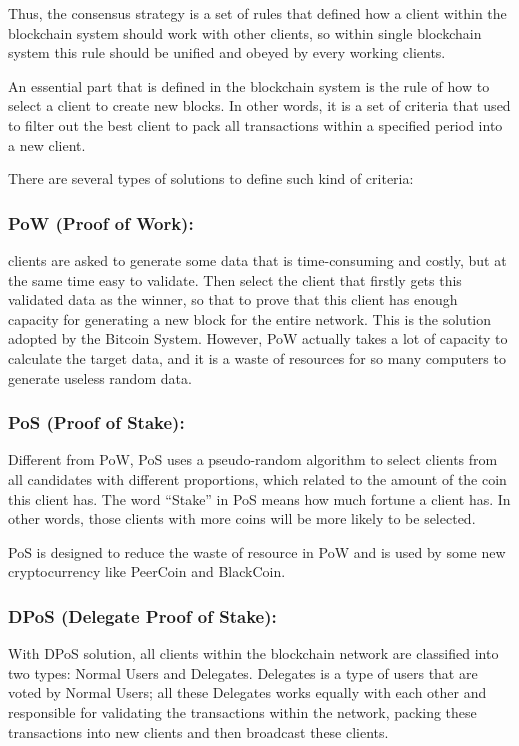 \documentclass[runningheads]{llncs}
\begin{document}
Thus, the consensus strategy is a set of rules that defined how a client within the blockchain system should work with other clients, so within single blockchain system this rule should be unified and obeyed by every working clients.

An essential part that is defined in the blockchain system is the rule of how to select a client to create new blocks. In other words, it is a set of criteria that used to filter out the best client to pack all transactions within a specified period into a new client.

There are several types of solutions to define such kind of criteria:

\subsubsection{PoW (Proof of Work):}

clients are asked to generate some data that is time-consuming and costly, but at the same time easy to validate. Then select the client that firstly gets this validated data as the winner, so that to prove that this client has enough capacity for generating a new block for the entire network. This is the solution adopted by the Bitcoin System. However, PoW actually takes a lot of capacity to calculate the target data, and it is a waste of resources for so many computers to generate useless random data.

\subsubsection{PoS (Proof of Stake):}

Different from PoW, PoS uses a pseudo-random algorithm to select clients from all candidates with different proportions, which related to the amount of the coin this client has. The word “Stake” in PoS means how much fortune a client has. In other words, those clients with more coins will be more likely to be selected.

PoS is designed to reduce the waste of resource in PoW and is used by some new cryptocurrency like PeerCoin\cite{peercoin} and BlackCoin\cite{blackcoin}.

\subsubsection{DPoS (Delegate Proof of Stake):}

With DPoS solution, all clients within the blockchain network are classified into two types: Normal Users and Delegates. Delegates is a type of users that are voted by Normal Users; all these Delegates works equally with each other and responsible for validating the transactions within the network, packing these transactions into new clients and then broadcast these clients.
\end{document}
